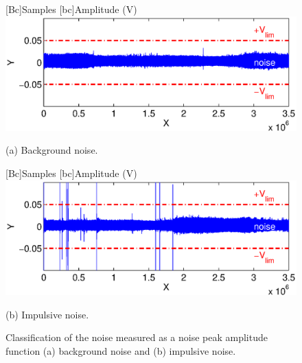 \documentclass[journal]{IEEEtran}
\begin{document}
\begin{figure} [!htb]
    \begin{minipage}[b]{\linewidth}
    [Bc]{Samples}    
    [bc]{Amplitude (V)}
    \includegraphics[width=\linewidth]{Figuras/limiteDeciRuidoRimpuls11.eps}
    \begin{center} \vspace{-.4cm}
    (a) Background noise.
    \end{center}
	\vfill
    \end{minipage} 
    \begin{minipage}[b]{\linewidth}
    [Bc]{Samples}    
    [bc]{Amplitude (V)}
    \includegraphics[width=\linewidth]{Figuras/limiteDeciRuidoRimpuls6.eps}
    \begin{center}\vspace{-.4cm}
    (b) Impulsive noise.
    \end{center}
    
    \end{minipage}
    \caption{Classification of the noise measured as a noise peak amplitude function  (a) background noise and (b) impulsive noise.}
    \label{Fig:limiteDeciRuidos}
\end{figure}
\end{document}
